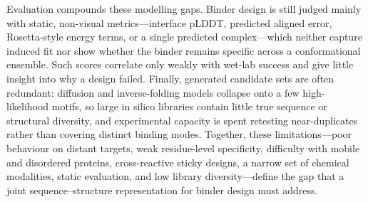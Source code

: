 \documentclass{article}
\begin{document}
Evaluation compounds these modelling gaps.
Binder design is still judged mainly with static, non-visual metrics---interface pLDDT,
predicted aligned error, Rosetta-style energy terms, or a single predicted complex---which neither 
capture induced fit nor show whether the binder remains specific across a conformational ensemble.
Such scores correlate only weakly with wet-lab success and give little insight into why a design failed.
Finally, generated candidate sets are often redundant: diffusion and inverse-folding models collapse onto
a few high-likelihood motifs, so large in silico libraries contain little true sequence or structural diversity,
and experimental capacity is spent retesting near-duplicates rather than covering distinct binding modes. 
Together, these limitations---poor behaviour on distant targets, weak residue-level specificity, difficulty
with mobile and disordered proteins, cross-reactive sticky designs, a narrow set of chemical modalities,
static evaluation, and low library diversity---define the gap that a joint sequence--structure 
representation for binder design must address.  
\end{document}

